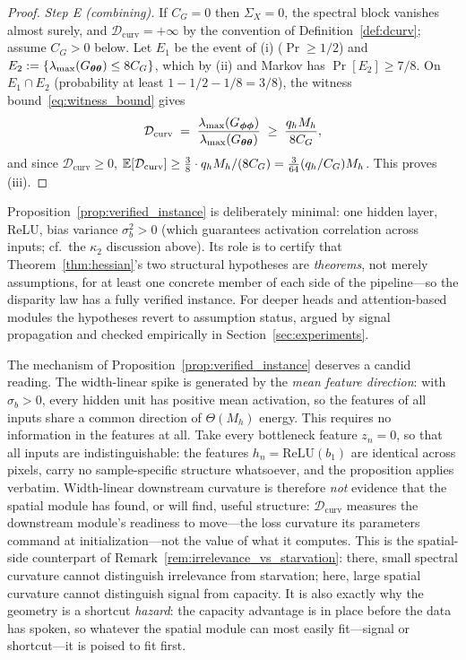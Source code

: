 \begin{proof}
\emph{Step E (combining).} If $C_G = 0$ then $\Sigma_X = 0$, the
spectral block vanishes almost surely, and
$\mathcal{D}_{\mathrm{curv}} = +\infty$ by the convention of
Definition~\ref{def:dcurv}; assume $C_G > 0$ below. Let $E_1$ be
the event of (i)
($\Pr \geq 1/2$) and $E_2 := \{ \lambda_{\max}(G_{{\boldsymbol{\theta}}{\boldsymbol{\theta}}})
\leq 8 C_G \}$, which by (ii) and Markov has $\Pr[E_2] \geq 7/8$. On
$E_1 \cap E_2$ (probability at least $1 - 1/2 - 1/8 = 3/8$), the
witness bound~\eqref{eq:witness_bound} gives
\[
    \mathcal{D}_{\mathrm{curv}}
    \;=\; \frac{\lambda_{\max}(G_{{\boldsymbol{\phi}}{\boldsymbol{\phi}}})}
               {\lambda_{\max}(G_{{\boldsymbol{\theta}}{\boldsymbol{\theta}}})}
    \;\geq\; \frac{q_h M_h}{8 C_G},
\]
and since $\mathcal{D}_{\mathrm{curv}} \geq 0$,
$\mathbb{E}[\mathcal{D}_{\mathrm{curv}}] \geq \tfrac{3}{8} \cdot
q_h M_h / (8 C_G) = \tfrac{3}{64} (q_h/C_G) M_h$. This proves
(iii).
\end{proof}

\begin{remark}
Proposition~\ref{prop:verified_instance} is deliberately minimal:
one hidden layer, ReLU, bias variance $\sigma_b^2 > 0$ (which
guarantees activation correlation across inputs; cf.\ the
$\kappa_2$ discussion above). Its role is to certify that
Theorem~\ref{thm:hessian}'s two structural hypotheses are
\emph{theorems}, not merely assumptions, for at least one concrete
member of each side of the pipeline---so the disparity law has a
fully verified instance. For deeper heads and attention-based
modules the hypotheses revert to assumption status, argued by
signal propagation and checked empirically in
Section~\ref{sec:experiments}.
\end{remark}

\begin{remark}
\label{rem:instance_interpretation}
The mechanism of Proposition~\ref{prop:verified_instance} deserves
a candid reading. The width-linear spike is generated by the
\emph{mean feature direction}: with $\sigma_b > 0$, every hidden
unit has positive mean activation, so the features of all inputs
share a common direction of $\Theta(M_h)$ energy. This requires no
information in the features at all. Take every bottleneck feature
$z_n = 0$, so that all inputs are indistinguishable: the features
$h_n = \mathrm{ReLU}(b_1)$ are identical across pixels, carry no
sample-specific structure whatsoever, and the proposition applies
verbatim. Width-linear downstream curvature is therefore \emph{not}
evidence that the spatial module has found, or will find, useful
structure: $\mathcal{D}_{\mathrm{curv}}$ measures the downstream
module's readiness to move---the loss curvature its parameters
command at initialization---not the value of what it computes. This
is the spatial-side counterpart of
Remark~\ref{rem:irrelevance_vs_starvation}: there, small spectral
curvature cannot distinguish irrelevance from starvation; here,
large spatial curvature cannot distinguish signal from capacity. It
is also exactly why the geometry is a shortcut \emph{hazard}: the
capacity advantage is in place before the data has spoken, so
whatever the spatial module can most easily fit---signal or
shortcut---it is poised to fit first.
\end{remark}

